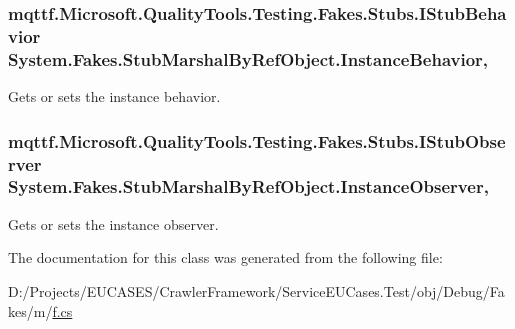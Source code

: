 \hypertarget{class_system_1_1_fakes_1_1_stub_marshal_by_ref_object_aff431b06244392e0bc58836b0e8e0756}{
\subsubsection[{Instance\-Behavior}]{\setlength{\rightskip}{0pt plus 5cm}mqttf.\-Microsoft.\-Quality\-Tools.\-Testing.\-Fakes.\-Stubs.\-I\-Stub\-Behavior System.\-Fakes.\-Stub\-Marshal\-By\-Ref\-Object.\-Instance\-Behavior\hspace{0.3cm}{\ttfamily [get]}, {\ttfamily [set]}}}\label{class_system_1_1_fakes_1_1_stub_marshal_by_ref_object_aff431b06244392e0bc58836b0e8e0756}


Gets or sets the instance behavior.

\hypertarget{class_system_1_1_fakes_1_1_stub_marshal_by_ref_object_aad21c20c2e3c26ed3b6ced604bc31399}{
\subsubsection[{Instance\-Observer}]{\setlength{\rightskip}{0pt plus 5cm}mqttf.\-Microsoft.\-Quality\-Tools.\-Testing.\-Fakes.\-Stubs.\-I\-Stub\-Observer System.\-Fakes.\-Stub\-Marshal\-By\-Ref\-Object.\-Instance\-Observer\hspace{0.3cm}{\ttfamily [get]}, {\ttfamily [set]}}}\label{class_system_1_1_fakes_1_1_stub_marshal_by_ref_object_aad21c20c2e3c26ed3b6ced604bc31399}


Gets or sets the instance observer.



The documentation for this class was generated from the following file\-:\begin{DoxyCompactItemize}
\item 
D\-:/\-Projects/\-E\-U\-C\-A\-S\-E\-S/\-Crawler\-Framework/\-Service\-E\-U\-Cases.\-Test/obj/\-Debug/\-Fakes/m/\hyperlink{m_2f_8cs}{f.\-cs}\end{DoxyCompactItemize}
